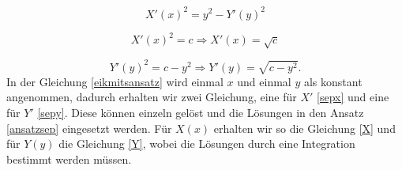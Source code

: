 \begin{refsection}
\begin{equation}\label{eikmitsansatz}
X'(x)^{2}=y^{2}-Y'(y)^{2}
\end{equation}

\begin{equation}\label{sepx}
X'(x)^{2}=c \Rightarrow X'(x)=\sqrt{c}
\end{equation}

\begin{equation}\label{sepy}
Y'(y)^{2}=c-y^{2}  \Rightarrow Y'(y)=\sqrt{c-y^{2}}.
\end{equation}
In der Gleichung \eqref{eikmitsansatz} wird einmal $x$ und einmal $y$ als konstant angenommen, dadurch erhalten wir zwei Gleichung, eine für $X'$ \eqref{sepx} und eine für $Y'$ \eqref{sepy}. Diese können einzeln gelöst und die Lösungen in den Ansatz \eqref{ansatzsep} eingesetzt werden. Für $X(x)$ erhalten wir so die Gleichung \eqref{X} und für $Y(y)$ die Gleichung \eqref{Y}, wobei die Lösungen durch eine Integration bestimmt werden müssen.


\end{refsection}
